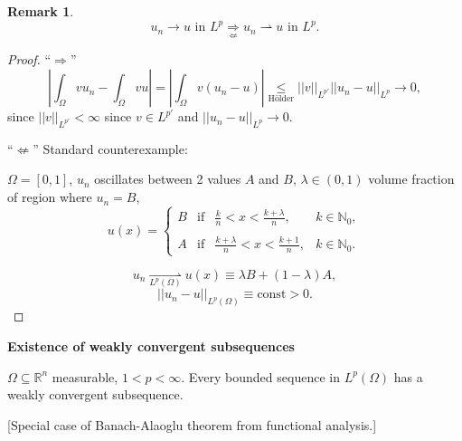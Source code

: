 \documentclass[12pt]{article}
\theoremstyle{definition}
\newtheorem*{remark}{Remark}
\begin{document}
\begin{remark}
\[u_n\rightarrow u\text{ in }L^p\underset{\not\Leftarrow}\Rightarrow u_n\rightharpoonup u\text{ in }L^p.\]
\end{remark}

\begin{proof}
``$\Rightarrow$''
\[\left|\int_\Omega vu_n-\int_\Omega vu\right|=\left|\int_\Omega v(u_n-u)\right|\underset{\text{H\"older}}\leq||v||_{L^{p'}}||u_n-u||_{L^p}\longrightarrow0,\]
since $||v||_{L^{p'}}<\infty$ since $v\in L^{p'}$ and $||u_n-u||_{L^p}\rightarrow0$.

``$\not\Leftarrow$'' Standard counterexample:

$\Omega=[0,1]$, $u_n$ oscillates between 2 values $A$ and $B$, $\lambda\in(0,1)$ volume fraction of region where $u_n=B$,
\[u(x)=\left\{\begin{array}{cccc}B&\text{if}&\displaystyle{\frac kn<x<\frac{k+\lambda}n,}&k\in\mathbb N_0,\\\\A&\text{if}&\displaystyle{\frac{k+\lambda}n<x<\frac{k+1}n,}&k\in\mathbb N_0.\end{array}\right.\]

\[u_n\underset{L^p(\Omega)}\rightharpoonup u(x)\equiv\lambda B+(1-\lambda)A,\]
\[||u_n-u||_{L^p(\Omega)}\equiv\text{const}>0.\]
\end{proof}

\textbf{Existence of weakly convergent subsequences}

$\Omega\subseteq\mathbb R^n$ measurable, $1<p<\infty$. Every bounded sequence in $L^p(\Omega)$ has a weakly convergent subsequence.

[Special case of Banach-Alaoglu theorem from functional analysis.]
\end{document}

